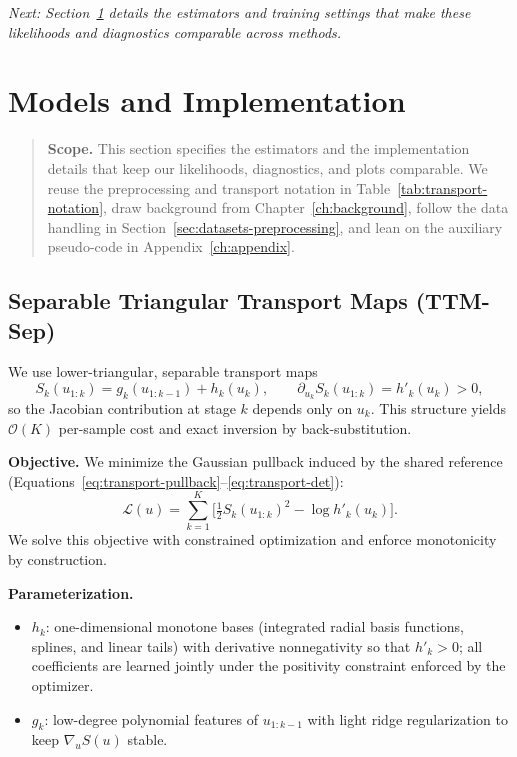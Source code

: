 \documentclass[11pt,a4paper,twoside]{book}\usepackage[]{graphicx}\usepackage[]{xcolor}
\begin{document}
\bigskip
\noindent\emph{Next: Section~\ref{sec:models-implementation} details the estimators and training settings that make these likelihoods and diagnostics comparable across methods.}


\section{Models and Implementation}\label{sec:models-implementation}

\begin{quote}
\textbf{Scope.} This section specifies the estimators and the implementation details that keep our likelihoods, diagnostics, and plots comparable. We reuse the preprocessing and transport notation in Table~\ref{tab:transport-notation}, draw background from Chapter~\ref{ch:background}, follow the data handling in Section~\ref{sec:datasets-preprocessing}, and lean on the auxiliary pseudo-code in Appendix~\ref{ch:appendix}.
\end{quote}

\subsection{Separable Triangular Transport Maps (TTM-Sep)}

We use lower-triangular, separable transport maps
\begin{equation}
  S_k(u_{1:k}) = g_k(u_{1:k-1}) + h_k(u_k), \qquad \partial_{u_k} S_k(u_{1:k}) = h'_k(u_k) > 0,
  \label{eq:ttm-separable-def}
\end{equation}
so the Jacobian contribution at stage $k$ depends only on $u_k$. This structure yields $\mathcal{O}(K)$ per-sample cost and exact inversion by back-substitution.

\textbf{Objective.} We minimize the Gaussian pullback induced by the shared reference (Equations~\eqref{eq:transport-pullback}--\eqref{eq:transport-det}):
\begin{equation}
  \mathcal{L}(u) = \sum_{k=1}^K \Big[ \tfrac{1}{2} S_k(u_{1:k})^2 - \log h'_k(u_k) \Big].
  \label{eq:ttm-separable-loss}
\end{equation}
We solve this objective with constrained optimization and enforce monotonicity by construction.

\textbf{Parameterization.}
\begin{itemize}
  \item $h_k$: one-dimensional monotone bases (integrated radial basis functions, splines, and linear tails) with derivative nonnegativity so that $h'_k > 0$; all coefficients are learned jointly under the positivity constraint enforced by the optimizer.
  \item $g_k$: low-degree polynomial features of $u_{1:k-1}$ with light ridge regularization to keep $\nabla_u S(u)$ stable.
\end{itemize}
\end{document}
